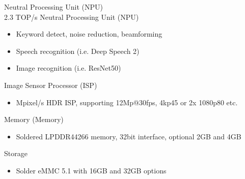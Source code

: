 \documentclass[letterpaper,10pt,openany,english]{sphinxmanual}
\begin{document}
\sphinxAtStartPar
Neutral Processing Unit (NPU)\\
2.3 TOP/s Neutral Processing Unit (NPU)
\begin{itemize}
\item {} 
\sphinxAtStartPar
Keyword detect, noise reduction, beamforming

\item {} 
\sphinxAtStartPar
Speech recognition (i.e. Deep Speech 2)

\item {} 
\sphinxAtStartPar
Image recognition (i.e. ResNet\sphinxhyphen{}50)

\end{itemize}

\sphinxAtStartPar
Image Sensor Processor (ISP)
\begin{itemize}
\item {} 
 Mpixel/s HDR ISP, supporting 12Mp@30fps, 4kp45 or 2x 1080p80 etc.

\end{itemize}

\sphinxAtStartPar
Memory (Memory)
\begin{itemize}
\item {} 
\sphinxAtStartPar
Soldered LPDDR4\sphinxhyphen{}4266 memory, 32\sphinxhyphen{}bit interface, optional 2GB and 4GB

\end{itemize}

\sphinxAtStartPar
Storage
\begin{itemize}
\item {} 
\sphinxAtStartPar
Solder eMMC 5.1 with 16GB and 32GB options

\end{itemize}
\end{document}
